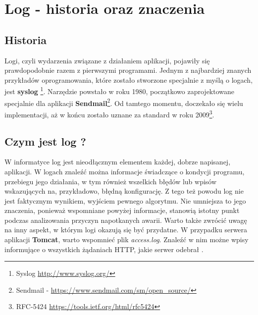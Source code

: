 \section{Log - historia oraz znaczenia}
\label{chapter:logs:history}

    \subsection{Historia}
    Logi, czyli wydarzenia związane z działaniem aplikacji, pojawiły się prawdopodobnie razem z pierwszymi programami.
    Jednym z najbardziej znanych przykładów oprogramowania, które zostało stworzone specjalnie z myślą o logach, jest \textbf{syslog}
    \footnote{Syslog \url{http://www.syslog.org/}}. Narzędzie powstało w roku 1980, początkowo zaprojektowane specjalnie
    dla aplikacji \textbf{Sendmail}\footnote{Sendmail - \url{https://www.sendmail.com/sm/open_source/}}. Od tamtego momentu,
    doczekało się wielu implementacji, aż w końcu zostało uznane za standard w roku 2009\footnote{RFC-5424 \url{https://tools.ietf.org/html/rfc5424}}.

    \subsection{Czym jest log ?}
    \label{chapter:logs:history:what_is_log}
    W informatyce log jest nieodłącznym elementem każdej, dobrze napisanej, aplikacji. 
    W logach znaleźć można informacje świadczące o kondycji programu, przebiegu jego działania, w tym również
    wszelkich błędów lub wpisów wskazujących na, przykładowo, błędną konfigurację. Z tego też powodu log nie jest faktycznym wynikiem,
    wyjściem pewnego algorytmu. Nie umniejsza to jego znaczenia, ponieważ wspomniane powyżej informacje, stanowią
    istotny punkt podczas analizowania przyczyn napotkanych awarii. Warto także zwrócić uwagę na inny aspekt,
    w którym logi okazują się być przydatne. W przypadku serwera aplikacji \textbf{Tomcat}, warto wspomnieć
    plik \textit{access.log}. Znaleźć w nim możne wpisy informujące o wszystkich żądaniach HTTP, jakie
    serwer odebrał \cite{tomcat_logs}.
    
